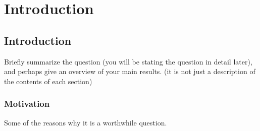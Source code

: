

\chapter{Introduction}

\ifpdf
    \graphicspath{{1_introduction/figures/PNG/}{1_introduction/figures/PDF/}{1_introduction/figures/}}
\else
    \graphicspath{{1_introduction/figures/EPS/}{1_introduction/figures/}}
\fi







\section{Introduction} %
Briefly summarize the question (you will be stating the question in detail later), and perhaps give an overview of your main results. (it is not just a description of the contents of each section)


\subsection{Motivation}
Some of the reasons why it is a worthwhile question.


